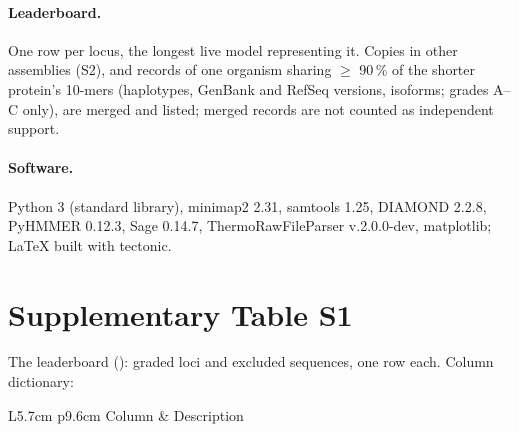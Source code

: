 \documentclass[11pt]{article}
\begin{document}
\paragraph{Leaderboard.} One row per locus, the longest live model representing it. Copies in other assemblies (S2), and
records of one organism sharing $\geq$ 90\,\% of the shorter protein's 10-mers (haplotypes, GenBank and RefSeq versions,
isoforms; grades A--C only), are merged and listed; merged records are not counted as independent support.

\paragraph{Software.} Python 3 (standard library), minimap2 2.31, samtools 1.25, DIAMOND 2.2.8, PyHMMER 0.12.3, Sage
0.14.7, ThermoRawFileParser v.2.0.0-dev, matplotlib; LaTeX built with tectonic.

\section*{Supplementary Table S1}
The leaderboard ():  graded loci and 
excluded sequences, one row each. Column dictionary:

{\small
\begin{longtable}{L{5.7cm} p{9.6cm}}
\toprule
Column & Description \\
\midrule
\endhead
{}
\bottomrule
\end{longtable}}



\end{document}
